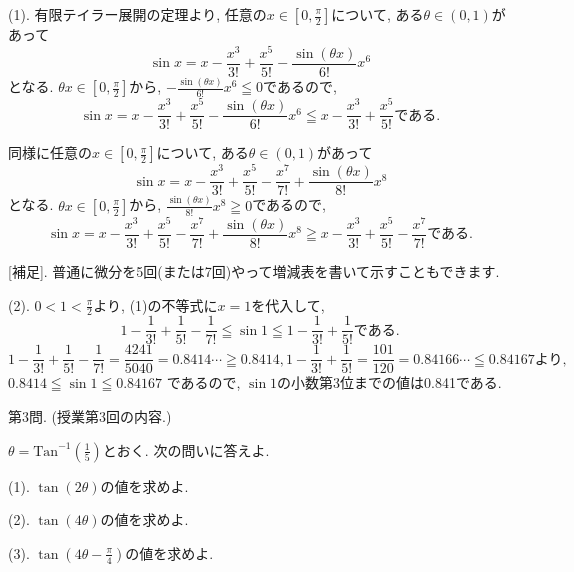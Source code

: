 \documentclass[dvipdfmx,a4paper,11pt]{article}
\newcommand{\Tan}{\text{Tan}^{-1}}
\theoremstyle{definition}
\begin{document}
\hspace{-11pt}{\Large $\bullet$ 第2問解答例.}

(1). 有限テイラー展開の定理より, 任意の$x \in [0, \frac{\pi}{2}]$について, ある$\theta \in (0,1)$があって
$$
\sin x = x - \frac{x^3}{3!} + \frac{x^5}{5!} -\frac{\sin(\theta x)}{6!}x^6
$$
 となる.
 $\theta x \in [0, \frac{\pi}{2}]$から, $-\frac{\sin(\theta x)}{6!}x^6 \leqq 0$であるので, 
$$
\sin x = x - \frac{x^3}{3!} + \frac{x^5}{5!} -\frac{\sin(\theta x)}{6!}x^6
\leqq x - \frac{x^3}{3!} + \frac{x^5}{5!}\text{である.}
$$ 

同様に任意の$x \in [0, \frac{\pi}{2}]$について, ある$\theta \in (0,1)$があって
$$
\sin x = x - \frac{x^3}{3!} + \frac{x^5}{5!} - \frac{x^7}{7!} + \frac{\sin(\theta x)}{8!}x^8
$$
 となる.
 $\theta x \in [0, \frac{\pi}{2}]$から, $\frac{\sin(\theta x)}{8!}x^8\geqq 0$であるので, 
$$
\sin x = x - \frac{x^3}{3!} + \frac{x^5}{5!} - \frac{x^7}{7!} + \frac{\sin(\theta x)}{8!}x^8
\geqq x - \frac{x^3}{3!} + \frac{x^5}{5!} - \frac{x^7}{7!} \text{である.}
$$ 

 [補足]. 普通に微分を5回(または7回)やって増減表を書いて示すこともできます. 

(2). $0 <1 < \frac{\pi}{2}$より, (1)の不等式に$x=1$を代入して, 
$$
1 - \frac{1}{3!} + \frac{1}{5!} - \frac{1}{7!}
\leqq \sin 1
\leqq  
1 - \frac{1}{3!} + \frac{1}{5!} \text{である.}
$$
$$
1 - \frac{1}{3!} + \frac{1}{5!} - \frac{1}{7!} =\frac{4241}{5040} = 0.8414\cdots \geqq0.8414, 
1 - \frac{1}{3!} + \frac{1}{5!}  =\frac{101}{120} = 0.84166\cdots \leqq 0.84167 \text{より, }
$$
$
0.8414 \leqq \sin 1 \leqq 0.84167
$
であるので, $\sin 1$の小数第3位までの値は0.841である.
   \vspace{33pt}
   
   {\Large 第3問.} (授業第3回の内容.)
    \vspace{11pt}
 
 $\theta = \Tan \left( \frac{1}{5} \right)$とおく.
 次の問いに答えよ.
 
 \vspace{11pt}
 
(1).  $\tan(2 \theta)$の値を求めよ.

    \vspace{11pt}
    
(2).  $\tan(4 \theta)$の値を求めよ.

\vspace{11pt}

(3).  $\tan(4 \theta - \frac{\pi}{4})$の値を求めよ.

\vspace{11pt}
\end{document}
